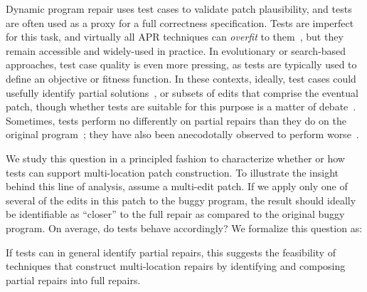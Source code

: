 \documentclass[10pt, conference]{IEEEtran}
\begin{document}
Dynamic program repair uses test cases to validate patch plausibility, and tests
are often used as a proxy for a full correctness specification. Tests are
imperfect for this task, and virtually all APR techniques can \emph{overfit} to
them~\cite{Smith15fse}, but they remain accessible and widely-used in practice.
%
In evolutionary or search-based approaches, test case quality is even more
pressing, as tests are typically used to define an objective or fitness
function. In these contexts, ideally, test cases could usefully identify partial
solutions~\cite{better-fitness}, or subsets of edits that comprise the eventual
patch, though whether tests are suitable for this purpose is a matter of
debate~\cite{ae,rsrepair}.  Sometimes, tests perform no differently on partial
repairs than they do on the original program~\cite{chris-thesis,
  source-code-checkpoint}; they have also been anecodotally observed to perform
worse~\cite{gecco09}.  

We study this question in a principled fashion to characterize whether or how
tests can support multi-location patch construction. To illustrate the insight
behind this line of analysis, assume a multi-edit patch. If we apply only one of
several of the edits in this patch to the buggy program, the result should
ideally be identifiable as ``closer'' to the full repair as compared to the
original buggy program. On average, do tests behave accordingly? We formalize
this question as:


If tests can in general identify partial repairs, this suggests the feasibility
of techniques that construct multi-location repairs by identifying and composing
partial repairs into full repairs.  

\end{document}
